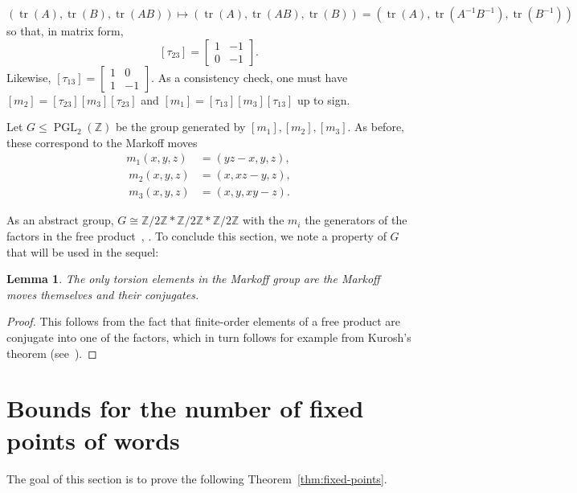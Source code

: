 \documentclass[10pt]{amsart}
\newtheorem{lemm}[theo]{Lemma}\newtheorem{prop}[theo]{Proposition}\newtheorem{coro}[theo]{Corollary}\newtheorem{conj}[theo]{Conjecture}
\theoremstyle{definition}\newtheorem{defi}[theo]{Definition}\newtheorem{rema}[theo]{Remark}\newtheorem{exam}[theo]{Example}\newtheorem{exem}[theo]{Example}\newtheorem{nota}[theo]{Notation}
\newcommand{\Z}{\mathbb{Z}}
\DeclareMathOperator{\tr}{tr}
\DeclareMathOperator{\PGL}{PGL}
\begin{document}
\[
(\tr(A),\tr(B),\tr(AB)) \mapsto (\tr(A), \tr(AB), \tr(B)) = \left(\tr(A), \tr\left(A^{-1}B^{-1}\right), \tr\left(B^{-1}\right)\right)
\]
so that, in matrix form,
\[
[\tau_{23}] =
\begin{bmatrix} 1 & -1 \\ 0 & -1
\end{bmatrix}.
\]
Likewise, $[\tau_{13}] =\left[
\begin{smallmatrix} 1 & 0 \\ 1 & -1
\end{smallmatrix}\right]$. As a consistency check, one must have $[m_2] = [\tau_{23}][m_3][\tau_{23}]$ and $[m_1] = [\tau_{13}][m_3][\tau_{13}]$ up to sign.



Let $G \leq \PGL_{2}(\Z)$ be the group generated by $[m_1],[m_2],[m_3]$. As before, these correspond to the Markoff moves
\begin{equation}
\begin{aligned}
m_{1}(x,y,z)&=(yz-x,y,z),\\
\:m_{2}(x,y,z)&=(x,xz-y,z),\\
\:m_{3}(x,y,z)&=(x,y,xy-z).
\end{aligned}
\end{equation}


As an abstract group, $G\cong\Z/2\Z*\Z/2\Z*\Z/2\Z$ with the $m_{i}$ the generators of the factors in the free product~\cite[Theorem~1]{EH}, \cite[Theorem~3.1]{CL}. To conclude this section, we note a property of $G$ that will be used in the sequel:

\begin{lemm}\label{lem:The-only-torsion}
The only torsion elements in the Markoff group are the Markoff moves themselves and their conjugates.
\end{lemm}
\begin{proof}
This follows from the fact that finite-order elements of a free product are conjugate into one of the factors, which in turn follows for example from Kurosh's theorem (see~\cite[Corollary~4.9.1]{MKS}).
\end{proof}


\section{Bounds for the number of fixed points of words} \label{sec:gl2-fixed}

The goal of this section is to prove the following Theorem~\ref{thm:fixed-points}.
\end{document}
